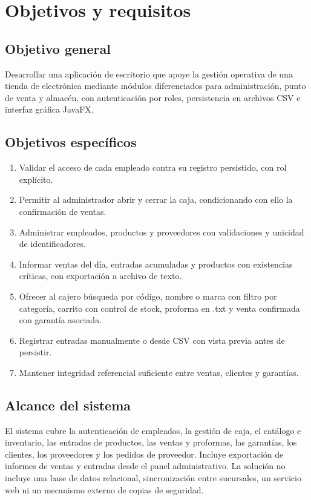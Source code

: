 \chapter{Objetivos y requisitos}

\section{Objetivo general}
Desarrollar una aplicación de escritorio que apoye la gestión operativa de una tienda de electrónica mediante módulos diferenciados para administración, punto de venta y almacén, con autenticación por roles, persistencia en archivos CSV e interfaz gráfica JavaFX.

\section{Objetivos específicos}
\begin{enumerate}
\item Validar el acceso de cada empleado contra su registro persistido, con rol explícito.
\item Permitir al administrador abrir y cerrar la caja, condicionando con ello la confirmación de ventas.
\item Administrar empleados, productos y proveedores con validaciones y unicidad de identificadores.
\item Informar ventas del día, entradas acumuladas y productos con existencias críticas, con exportación a archivo de texto.
\item Ofrecer al cajero búsqueda por código, nombre o marca con filtro por categoría, carrito con control de stock, proforma en .txt y venta confirmada con garantía asociada.
\item Registrar entradas manualmente o desde CSV con vista previa antes de persistir.
\item Mantener integridad referencial suficiente entre ventas, clientes y garantías.
\end{enumerate}

\section{Alcance del sistema}
El sistema cubre la autenticación de empleados, la gestión de caja, el catálogo e inventario, las entradas de productos, las ventas y proformas, las garantías, los clientes, los proveedores y los pedidos de proveedor. Incluye exportación de informes de ventas y entradas desde el panel administrativo. La solución no incluye una base de datos relacional, sincronización entre sucursales, un servicio web ni un mecanismo externo de copias de seguridad.

